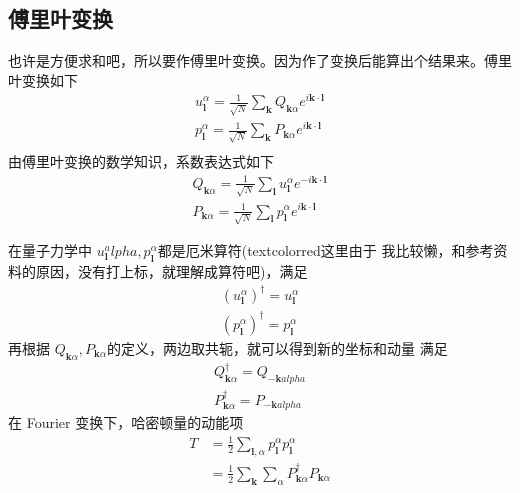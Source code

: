 \subsection{傅里叶变换}
也许是方便求和吧，所以要作傅里叶变换。因为作了变换后能算出个结果来。傅里叶变换如下
\begin{equation}
    \begin{aligned} 
    u_\mathbf{l}^\alpha = \frac{1}{\sqrt{N}} \sum_\mathbf{k} Q_{\mathbf{k}\alpha} e^{i \mathbf{k\cdot l}} \\
    p_\mathbf{l}^\alpha = \frac{1}{\sqrt{N}} \sum_\mathbf{k} P_{\mathbf{k}\alpha} e^{i \mathbf{k\cdot l}} \\ 
    \end{aligned} 
\end{equation}
由傅里叶变换的数学知识，系数表达式如下
\begin{equation}
    \begin{aligned} 
    Q_{\mathbf{k} \alpha } = \frac{1}{\sqrt{N}} \sum_\mathbf{l} u_\mathbf{l}^\alpha e^{-i \mathbf{k\cdot l} } \\  
    P_{\mathbf{k} \alpha } = \frac{1}{\sqrt{N}} \sum_\mathbf{l} p_\mathbf{l}^\alpha e^{i \mathbf{k\cdot l} } 
    \end{aligned} 
\end{equation}
\par 在量子力学中 $u_\mathbf{l}^alpha, p_\mathbf{l}^\alpha$都是厄米算符(textcolor{red}{这里由于
我比较懒，和参考资料的原因，没有打上标，就理解成算符吧})，满足
\begin{equation}
    \begin{aligned} 
    (u_\mathbf{l}^\alpha )^\dagger = u_\mathbf{l}^\alpha \\
    (p_\mathbf{l}^\alpha )^\dagger = p_\mathbf{l}^\alpha
    \end{aligned} 
\end{equation}  
再根据 $Q_{\mathbf{k}\alpha },P_{\mathbf{k} \alpha }$的定义，两边取共轭，就可以得到新的坐标和动量
满足
\begin{equation}
    \begin{aligned} 
    Q_{\mathbf{k}\alpha }^\dagger = Q_{-\mathbf{k}alpha } \\
    P_{\mathbf{k}\alpha }^\dagger = P_{-\mathbf{k}alpha }
    \end{aligned} 
\end{equation}
在 Fourier 变换下，哈密顿量的动能项
\begin{equation}
    \begin{aligned} 
    T &= \frac{1}{2}\sum_{\mathbf{l},\alpha}p_\mathbf{l}^\alpha  p_\mathbf{l}^\alpha  \\
      &= \frac{1}{2}\sum_\mathbf{k}\sum_\alpha  P_{\mathbf{k}\alpha }^\dagger P_{\mathbf{k}\alpha }
    \end{aligned} 
\end{equation}
